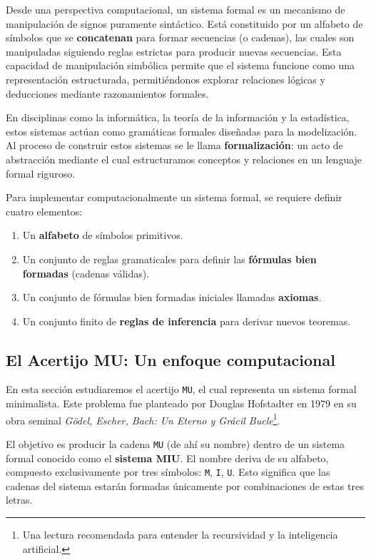 Desde una perspectiva computacional, un sistema formal es un mecanismo de manipulación de signos puramente sintáctico.
Está constituido por un alfabeto de símbolos que se \textbf{concatenan} para formar secuencias (o cadenas), las cuales
son manipuladas siguiendo reglas estrictas para producir nuevas secuencias. Esta capacidad de manipulación simbólica
permite que el sistema funcione como una representación estructurada, permitiéndonos explorar relaciones lógicas y
deducciones mediante razonamientos formales.

En disciplinas como la informática, la teoría de la información y la estadística, estos sistemas actúan como gramáticas
formales diseñadas para la modelización. Al proceso de construir estos sistemas se le llama \textbf{formalización}: un
acto de abstracción mediante el cual estructuramos conceptos y relaciones en un lenguaje formal riguroso.

Para implementar computacionalmente un sistema formal, se requiere definir cuatro elementos:
\begin{enumerate}
    \item Un \textbf{alfabeto} de símbolos primitivos.
    \item Un conjunto de reglas gramaticales para definir las \textbf{fórmulas bien formadas} (cadenas válidas).
    \item Un conjunto de fórmulas bien formadas iniciales llamadas \textbf{axiomas}.
    \item Un conjunto finito de \textbf{reglas de inferencia} para derivar nuevos teoremas.
\end{enumerate}

\subsection{El Acertijo MU: Un enfoque computacional}

En esta sección estudiaremos el acertijo \texttt{MU}, el cual representa un sistema formal minimalista. Este problema
fue planteado por Douglas Hofstadter en 1979 en su obra seminal \emph{Gödel, Escher, Bach: Un Eterno y Grácil
    Bucle}\footnote{Una lectura recomendada para entender la recursividad y la inteligencia artificial.}.

El objetivo es producir la cadena \texttt{MU} (de ahí su nombre) dentro de un sistema formal conocido como el
\textbf{sistema MIU}. El nombre deriva de su alfabeto, compuesto exclusivamente por tres símbolos: \texttt{M},
\texttt{I}, \texttt{U}. Esto significa que las cadenas del sistema estarán formadas únicamente por combinaciones de
estas tres letras.

